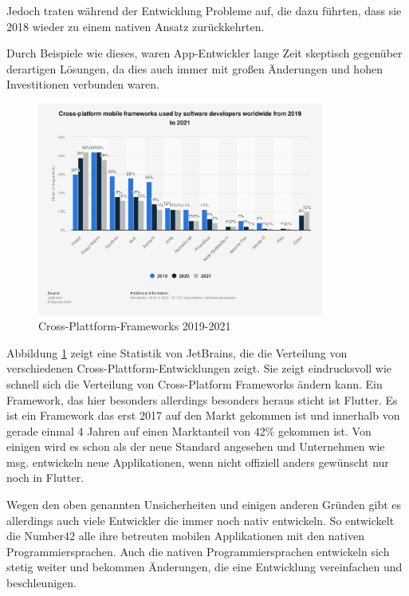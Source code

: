 Jedoch traten während der Entwicklung Probleme auf, die dazu führten, dass sie 2018 wieder zu einem nativen Ansatz zurückkehrten.

Durch Beispiele wie dieses, waren App-Entwickler lange Zeit skeptisch gegenüber derartigen Lösungen, da dies auch immer mit großen Änderungen und hohen Investitionen verbunden waren.

\begin{figure}[ht]
  \centering
  \includegraphics[height=7cm,keepaspectratio]{images/cross-platform-mobile-frameworks.png} 
  \caption{Cross-Plattform-Frameworks 2019-2021 \cite{statist_CP_Framework}}
  \label{fig:statista_cross_plattform}
\end{figure}
Abbildung \ref{fig:statista_cross_plattform} zeigt eine Statistik von JetBrains, die die Verteilung von verschiedenen Cross-Plattform-Entwicklungen zeigt. Sie zeigt eindrucksvoll wie schnell sich die Verteilung von Cross-Platform Frameworks ändern kann.
Ein Framework, das hier besonders allerdings besonders heraus sticht ist Flutter. Es ist ein Framework das erst 2017 auf den Markt gekommen ist und innerhalb von gerade einmal 4 Jahren auf einen Marktanteil von 42\% gekommen ist. Von einigen wird es schon als der neue Standard angesehen und Unternehmen wie msg. entwickeln neue Applikationen, wenn nicht offiziell anders gewünscht nur noch in Flutter.

Wegen den oben genannten Unsicherheiten und einigen anderen Gründen gibt es allerdings auch viele Entwickler die immer noch nativ entwickeln. So entwickelt die Number42 alle ihre betreuten mobilen Applikationen mit den nativen Programmiersprachen. Auch die nativen Programmiersprachen entwickeln sich stetig weiter und bekommen Änderungen, die eine Entwicklung vereinfachen und beschleunigen.



